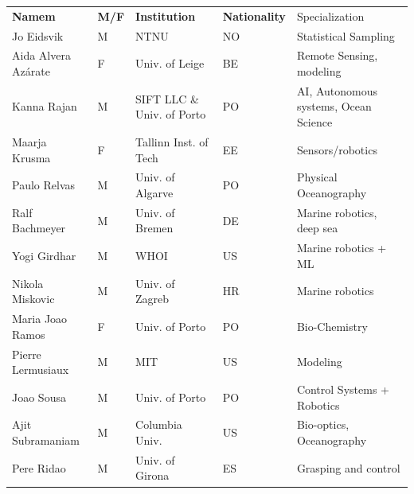 \begin{table}[H]
  \footnotesize{
\begin{tabular}{|p{3cm}|p{0.5cm}|p{3.5cm}|p{0.5cm}|p{6cm}|}
  \rowcolor{Gray}
  \bfseries Namem& \bfseries M/F&\bfseries Institution & \bfseries Nationality& Specialization\\
Jo Eidsvik               & M   & NTNU                                  & NO       & Statistical Sampling                            \\
\hline
Aida Alvera Az\'{a}rate    & F   & Univ. of Leige                        & BE       & Remote Sensing, modeling                        \\
\hline
Kanna Rajan              & M   & SIFT LLC \& Univ. of Porto            & PO       & AI, Autonomous systems, Ocean Science           \\
 \hline
Maarja Krusma            & F   & Tallinn Inst. of Tech                 & EE  & Sensors/robotics                                \\
  \hline
Paulo Relvas             & M   & Univ. of Algarve                      & PO       & Physical Oceanography                           \\
\hline
Ralf Bachmeyer           & M   & Univ. of Bremen                       & DE       & Marine robotics, deep sea                       \\
\hline
Yogi Girdhar             & M   & WHOI                                  & US       & Marine robotics + ML                            \\
\hline
Nikola Miskovic          & M   & Univ. of Zagreb                       & HR  & Marine robotics                                 \\
\hline
Maria Joao Ramos         & F   & Univ. of Porto                        & PO       & Bio-Chemistry                                   \\
\hline
Pierre Lermusiaux        & M   & MIT                                   & US       & Modeling                                        \\
\hline
Joao Sousa               & M   & Univ. of Porto                        & PO       & Control Systems + Robotics                      \\
\hline
Ajit Subramaniam         & M   & Columbia Univ.                        & US       & Bio-optics, Oceanography                        \\
\hline
Pere Ridao               & M   & Univ. of Girona                       & ES       & Grasping and control                            \\

\end{tabular}}
\end{table}
